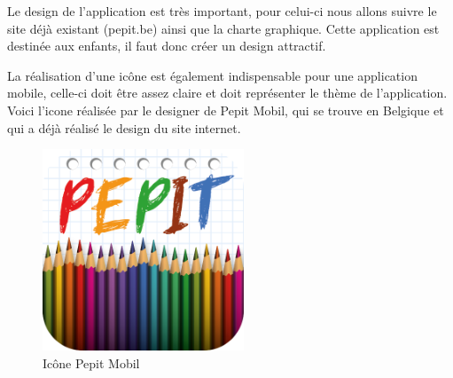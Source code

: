 Le design de l'application est très important, pour celui-ci nous allons suivre le site déjà existant (pepit.be) ainsi que la charte graphique. Cette application est destinée aux enfants, il faut donc créer un design attractif.


La réalisation d'une icône est également indispensable pour une application mobile, celle-ci doit \^{e}tre assez claire et doit représenter le thème de l'application. Voici l'icone réalisée par le designer de Pepit Mobil, qui se trouve en Belgique et qui a déjà réalisé le design du site internet.


\begin{figure}[H]
\begin{center}
\includegraphics[width=6cm]{images/icone}
\end{center}
\caption{Icône Pepit Mobil}
\label{Icone Pepit Mobil}
\end{figure}
